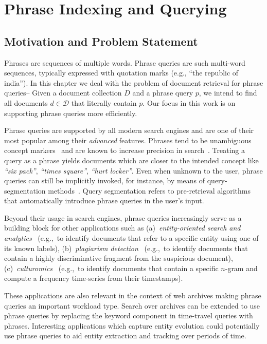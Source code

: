 \chapter{Phrase Indexing and Querying}
\label{chap:phrases}


\section{Motivation and Problem Statement}

Phrases are sequences of multiple words. Phrase queries are such multi-word sequences, typically expressed with quotation marks (e.g., \textsf{``the republic of india''}). In this chapter we deal with the problem of document retrieval for phrase queries-- Given a document collection $D$ and a phrase query $p$, we intend to find all documents $d \in \mathcal{D}$ that literally contain $p$. Our focus in this work is on supporting phrase queries more efficiently.

Phrase queries are supported by all modern search engines and are one
of their most popular among their \emph{advanced} features. Phrases tend to be unambiguous concept markers~\cite{salton1989automatic, croft1991use,lewis1989term} and are known to increase precision in search~\cite{de1999phrase}. Treating a query as a phrase yields documents which are closer to the intended concept like \emph{``six pack''}, \emph{``times square''}, \emph{``hurt locker''}. Even when
unknown to the user, phrase queries can still be implicitly invoked,
for instance, by means of query-segmentation methods~\cite{Hagen:2012fk,Li:2011kx}. Query segmentation refers to pre-retrieval algorithms that automatically introduce phrase queries in the user's input. 

Beyond their usage in search engines, phrase queries increasingly serve as a building block for other applications such as (a)~\emph{entity-oriented search and analytics}~\cite{agrawalCCG:vldb08} (e.g.,~to identify documents that
refer to a specific entity using one of its known labels), (b)~\emph{plagiarism detection}~\cite{Stamatatos:2011uq} (e.g.,~to
identify documents that contain a highly discriminative fragment from
the suspicious document), (c)~\emph{culturomics}~\cite{Michel:ys}
(e.g.,~to identify documents that contain a specific $n$-gram and
compute a frequency time-series from their timestamps).

These applications are also relevant in the context of web archives making phrase queries an important workload type. Search over archives can be extended to use phrase queries by replacing the keyword component in time-travel queries with phrases. Interesting applications which capture entity evolution could potentially use phrase queries to aid entity extraction and tracking over periods of time. 


